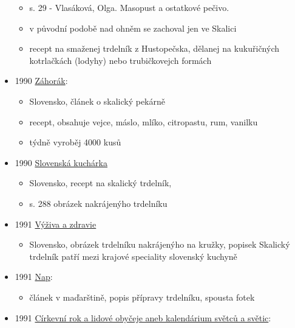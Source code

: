 \begin{itemize}
  \begin{itemize}
  \tightlist
  \item
    s. 29 - Vlasáková, Olga. Masopust a ostatkové pečivo.
  \item
    v původní podobě nad ohněm se zachoval jen ve Skalici
  \item
    recept na smaženej trdelník z Hustopečska, dělanej na kukuřičných
    kotrlačkách (lodyhy) nebo trubičkovejch formách
  \end{itemize}
\item
  1990
  \href{https://dikda.snk.sk/uuid/uuid:d4c3bafc-0e1e-4cb1-8e37-24b0294ec64b}{Záhorák}:

  \begin{itemize}
  \tightlist
  \item
    Slovensko, článek o skalický pekárně
  \item
    recept, obsahuje vejce, máslo, mlíko, citropastu, rum, vanilku
  \item
    týdně vyroběj 4000 kusů
  \end{itemize}
\item
  1990
  \href{https://dikda.snk.sk/uuid/uuid:51e3241b-d1cc-4430-a318-822c58fc4dae}{Slovenská
  kuchárka}

  \begin{itemize}
  \tightlist
  \item
    Slovensko, recept na skalický trdelník,
  \item
    s. 288 obrázek nakrájenýho trdelníku
  \end{itemize}
\item
  1991
  \href{https://dikda.snk.sk/uuid/uuid:7e3fed6a-4442-4a06-9976-aac07df998ce}{Výživa
  a zdravie}

  \begin{itemize}
  \tightlist
  \item
    Slovensko, obrázek trdelníku nakrájenýho na kružky, popisek Skalický
    trdelník patří mezi krajové speciality slovenský kuchyně
  \end{itemize}
\item
  1991
  \href{https://dikda.snk.sk/uuid/uuid:fa8b23b1-0cee-454b-898b-73643d919956}{Nap}:

  \begin{itemize}
  \tightlist
  \item
    článek v maďarštině, popis přípravy trdelníku, spousta fotek
  \end{itemize}
\item
  1991
  \href{https://ceskadigitalniknihovna.cz/uuid/uuid:c0d88b90-df55-11e6-b333-5ef3fc9ae867}{Církevní
  rok a lidové obyčeje aneb kalendárium světců a světic}:


\end{itemize}
